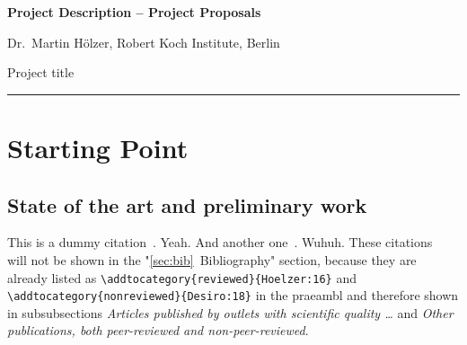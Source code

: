 \documentclass{scrartcl}
\newcommand{\applicants}{Dr.\ Martin H\"olzer, Robert Koch Institute, Berlin}
\newcommand{\project}{Project title}
\begin{document}
\pagestyle{empty}
\setcounter{page}{0}



\cleardoublepage
\pagestyle{plain}


{\raggedright{} \normalsize \bfseries 
	Project Description -- Project Proposals \par
	\applicants{} \par
	\project{} \par
	\rule{\textwidth}{0.5pt} \par
}

\section{Starting Point}
\label{sec:work-report}

\subsection{State of the art and preliminary work}

This is a dummy citation~\cite{Hoelzer:17}. Yeah. And another
one~\cite{Gerst:18}. Wuhuh. These citations~\cite{Hoelzer:16, Desiro:18} will
not be shown in the "\ref{sec:bib}~Bibliography" section, because they are
already listed as \verb=\addtocategory{reviewed}{Hoelzer:16}= and
\verb=\addtocategory{nonreviewed}{Desiro:18}= in the praeambl and therefore
shown in subsubsections \emph{Articles published by outlets with scientific
quality \dots} and \emph{Other publications, both peer-reviewed and non-peer-reviewed}. 
\end{document}
